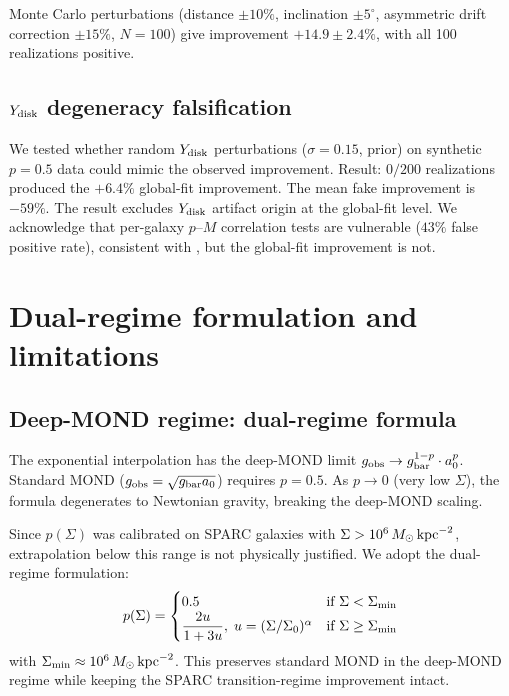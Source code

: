 \documentclass[twocolumn]{aastex631}
\begin{document}
Monte Carlo perturbations (distance $\pm 10\%$, inclination
$\pm 5^\circ$, asymmetric drift correction $\pm 15\%$, $N=100$) give
improvement $+14.9 \pm 2.4\%$, with all 100 realizations positive.

\subsection{$Y_{\rm disk}$ degeneracy falsification}

We tested whether random $Y_{\rm disk}$ perturbations ($\sigma = 0.15$,
\citealt{Li2021} prior) on synthetic $p = 0.5$ data could mimic the
observed improvement. Result: $0/200$ realizations produced the
$+6.4\%$ global-fit improvement. The mean fake improvement is
$-59\%$. The result excludes $Y_{\rm disk}$ artifact origin at the
global-fit level. We acknowledge that per-galaxy $p$--$M$ correlation
tests are vulnerable ($43\%$ false positive rate), consistent with
\citet{Li2021}, but the global-fit improvement is not.

\section{Dual-regime formulation and limitations}

\subsection{Deep-MOND regime: dual-regime formula}

The exponential interpolation has the deep-MOND limit
$g_{\rm obs} \to g_{\rm bar}^{1-p} \cdot a_0^p$. Standard MOND
($g_{\rm obs} = \sqrt{g_{\rm bar} a_0}$) requires $p = 0.5$. As
$p \to 0$ (very low $\Sigma$), the formula degenerates to
Newtonian gravity, breaking the deep-MOND scaling.

Since $p(\Sigma)$ was calibrated on SPARC galaxies with $\Sigma >
10^6\,M_\odot\,{\rm kpc}^{-2}$, extrapolation below this range is
not physically justified. We adopt the dual-regime formulation:
\begin{equation}
p(\Sigma) = \begin{cases}
  0.5 & \text{if } \Sigma < \Sigma_{\rm min} \\
  \dfrac{2u}{1+3u}, \; u=(\Sigma/\Sigma_0)^{\alpha}
    & \text{if } \Sigma \geq \Sigma_{\rm min}
\end{cases}
\label{eq:dual}
\end{equation}
with $\Sigma_{\rm min} \approx 10^6\,M_\odot\,{\rm kpc}^{-2}$. This
preserves standard MOND in the deep-MOND regime while keeping the
SPARC transition-regime improvement intact.
\end{document}
